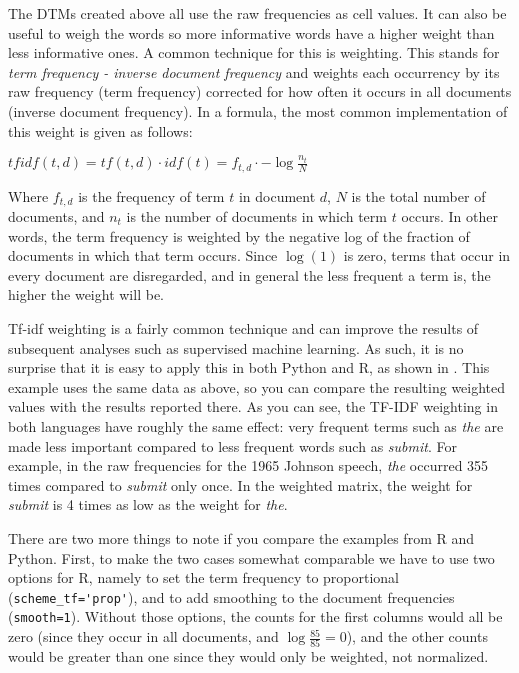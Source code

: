 The DTMs created above all use the raw frequencies as cell values.
It can also be useful to weigh the words so more informative words have a higher weight than less informative ones.
A common technique for this is  weighting.
This stands for \emph{term frequency - inverse document frequency} and weights each occurrency by its raw frequency (term frequency) corrected for how often it occurs in all documents (inverse document frequency). In a formula, the most common implementation of this weight is given as follows:

$tfidf(t,d)=tf(t,d)\cdot idf(t)=f_{t,d}\cdot -\log \frac{n_t}{N}$

Where $f_{t,d}$ is the frequency of term $t$ in document $d$, $N$ is the total number of documents, and $n_t$ is the number of documents in which term $t$ occurs. In other words, the term frequency is weighted by the negative log of the fraction of documents in which that term occurs. Since $\log(1)$ is zero, terms that occur in every document are disregarded, and in general the less frequent a term is, the higher the weight will be. 



Tf-idf weighting is a fairly common technique and can improve the results of subsequent analyses such as supervised machine learning.
As such, it is no surprise that it is easy to apply this in both Python and R, as shown in .
This example uses the same data as  above, so you can compare the resulting weighted values with the results reported there.
As you can see, the TF-IDF weighting in both languages have roughly the same effect:
very frequent terms such as \emph{the} are made less important compared to less frequent words such as \emph{submit}.
For example, in the raw frequencies for the 1965 Johnson speech, \emph{the} occurred 355 times compared to \emph{submit} only once.
In the weighted matrix, the weight for \emph{submit} is 4 times as low as the weight for \emph{the}.

There are two more things to note if you compare the examples from R and Python.
First, to make the two cases somewhat comparable we have to use two options for R, namely to set the term frequency to proportional (\verb|scheme_tf='prop'|),
and to add smoothing to the document frequencies (\verb|smooth=1|).
Without those options, the counts for the first columns would all be zero (since they occur in all documents, and $\log \frac{85}{85}=0$),
and the other counts would be greater than one since they would only be weighted, not normalized.

